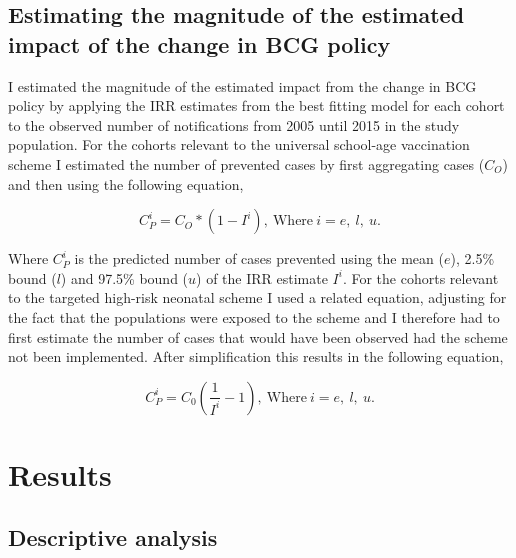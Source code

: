 \documentclass[11pt,twoside]{bristolthesis}
\begin{document}
  \hypertarget{magnitude-estimation}{%
  \subsection{Estimating the magnitude of the estimated impact of the change in BCG policy}\label{magnitude-estimation}}
  
  I estimated the magnitude of the estimated impact from the change in BCG policy by applying the IRR estimates from the best fitting model for each cohort to the observed number of notifications from 2005 until 2015 in the study population. For the cohorts relevant to the universal school-age vaccination scheme I estimated the number of prevented cases by first aggregating cases (\(C_O\)) and then using the following equation,
  
  \[ C^i_P = C_O * (1 - I^i),\ \text{Where}\ i = e,\ l,\ u.\]
  
  Where \(C^i_P\) is the predicted number of cases prevented using the mean (\(e\)), 2.5\% bound (\(l\)) and 97.5\% bound (\(u\)) of the IRR estimate \(I^i\). For the cohorts relevant to the targeted high-risk neonatal scheme I used a related equation, adjusting for the fact that the populations were exposed to the scheme and I therefore had to first estimate the number of cases that would have been observed had the scheme not been implemented. After simplification this results in the following equation,
  
  \[ C^i_P =  C_0\left(\frac{1}{I^i } - 1\right),\ \text{Where}\ i = e,\ l,\ u.\]
  
  \hypertarget{results-2}{%
  \section{Results}\label{results-2}}
  
  \hypertarget{descriptive-analysis}{%
  \subsection{Descriptive analysis}\label{descriptive-analysis}}
  
\end{document}
